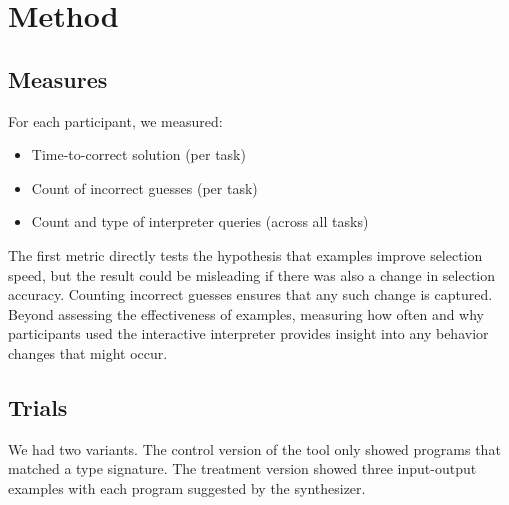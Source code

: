 \section{Method}




\subsection{Measures}
For each participant, we measured:
\begin{itemize}
    \item Time-to-correct solution (per task)
    \item Count of incorrect guesses (per task)
    \item Count and type of interpreter queries (across all tasks)
\end{itemize}

The first metric directly tests the hypothesis that examples improve
selection speed, but the result could be misleading if there was also a
change in selection accuracy.
%
Counting incorrect guesses ensures that any such change is captured.
%
Beyond assessing the effectiveness of examples, measuring how often and why
participants used the interactive interpreter provides insight into any
behavior changes that might occur.

\subsection{Trials}
We had two variants.
%
The control version of the tool only showed programs that matched a type signature.
%
The treatment version showed three input-output examples with each program
suggested by the synthesizer.

